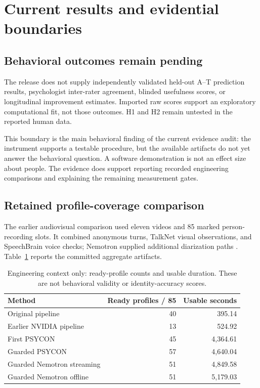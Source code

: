 \documentclass{article}
\begin{document}
\section{Current results and evidential boundaries}
\subsection{Behavioral outcomes remain pending}
The release does not supply independently validated held-out A--T prediction results, psychologist inter-rater agreement, blinded usefulness scores, or longitudinal improvement estimates. Imported raw scores support an exploratory computational fit, not those outcomes. H1 and H2 remain untested in the reported human data.

This boundary is the main behavioral finding of the current evidence audit: the instrument supports a testable procedure, but the available artifacts do not yet answer the behavioral question. A software demonstration is not an effect size about people. The evidence does support reporting recorded engineering comparisons and explaining the remaining measurement gates.

\subsection{Retained profile-coverage comparison}
The earlier audiovisual comparison used eleven videos and 85 marked person-recording slots. It combined anonymous turns, TalkNet visual observations, and SpeechBrain voice checks; Nemotron supplied additional diarization paths \cite{nemotron}. Table~\ref{tab:coverage} reports the committed aggregate artifacts.

\begin{table}[ht]
\caption{Engineering context only: ready-profile counts and usable duration. These are not behavioral validity or identity-accuracy scores.}
\label{tab:coverage}
\centering
\begin{tabular}{@{}lrr@{}}
\toprule Method & Ready profiles / 85 & Usable seconds \\
\midrule
Original pipeline & 40 & 395.14 \\
Earlier NVIDIA pipeline & 13 & 524.92 \\
First PSYCON & 45 & 4,364.61 \\
Guarded PSYCON & 57 & 4,640.04 \\
Guarded Nemotron streaming & 51 & 4,849.58 \\
Guarded Nemotron offline & 51 & 5,179.03 \\
\bottomrule
\end{tabular}
\end{table}
\end{document}
